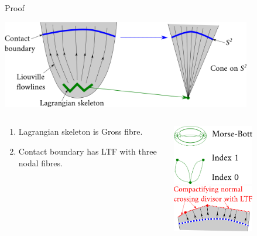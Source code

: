 \documentclass{beamer}
\begin{document}
\begin{frame}
{Proof}
\begin{center}
\includegraphics[width=310pt]{proof1}


\vspace{1cm}


\begin{minipage}[0.2\textheight]{\textwidth}
\begin{columns}[T]
\begin{column}{0.6\textwidth}
\begin{enumerate}
\item <2-> Lagrangian skeleton is Gross fibre.
\item <3> Contact boundary has LTF with three nodal fibres.
\end{enumerate}
\end{column}
\begin{column}{0.4\textwidth}
\begin{overprint}
\centering\includegraphics[width=100pt]{skeleton}
\centering\includegraphics[width=100pt]{divisor}
\end{overprint}
\end{column}
\end{columns}
\end{minipage}
\end{center}
\end{frame}
\end{document}

